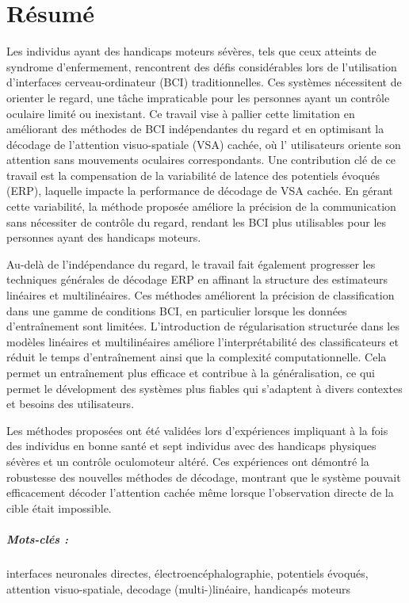 \chapter*{R\'esum\'e}

Les individus ayant des handicaps moteurs sévères, tels que ceux atteints de
syndrome d'enfermement, rencontrent des défis considérables
lors de l'utilisation d'interfaces cerveau-ordinateur (BCI)  traditionnelles.
Ces systèmes nécessitent de orienter le regard, une tâche impraticable pour
les personnes ayant un contrôle oculaire limité ou inexistant.
Ce travail vise \`a pallier cette limitation en améliorant des méthodes de BCI
indépendantes du regard et en optimisant la décodage de l'attention visuo-spatiale (VSA) cachée,
où l' utilisateurs oriente son attention sans mouvements oculaires correspondants.
Une contribution clé de ce travail est la compensation de
la variabilité de latence des potentiels évoqués (ERP), laquelle impacte
la performance de décodage de VSA cachée.
En gérant cette variabilit\'e, la méthode proposée améliore la précision de la communication
sans nécessiter de contrôle du regard, rendant les BCI plus utilisables pour les personnes ayant des handicaps moteurs.

Au-delà de l'indépendance du regard, le travail fait également progresser les
techniques générales de décodage ERP en affinant la structure des estimateurs
linéaires et multilinéaires.
Ces méthodes améliorent la précision de classification dans une gamme de
conditions BCI, en particulier lorsque les données d'entraînement sont limitées.
L'introduction de régularisation structurée dans les modèles linéaires et
multilinéaires améliore l'interprétabilité des classificateurs et réduit le temps d'entraînement ainsi que la complexité computationnelle.
Cela permet un entraînement plus efficace et contribue à la g\'en\'eralisation, ce qui
permet le d\'evelopment des systèmes plus fiables qui s'adaptent à divers
contextes et besoins des utilisateurs.

Les méthodes proposées ont été validées lors d'expériences impliquant à la fois
des individus en bonne santé et sept individus avec des handicaps physiques sévères et un contrôle oculomoteur altéré.
Ces expériences ont démontré la robustesse des nouvelles méthodes de décodage, montrant que le système pouvait efficacement décoder l'attention cachée même lorsque l'observation directe de la cible  était impossible.

\bigskip

\paragraph{Mots-clés :}
interfaces neuronales directes,
\'electroenc\'ephalographie,
potentiels \'evoqu\'es,
attention visuo-spatiale,
decodage (multi-)linéaire,
handicap\'es moteurs
